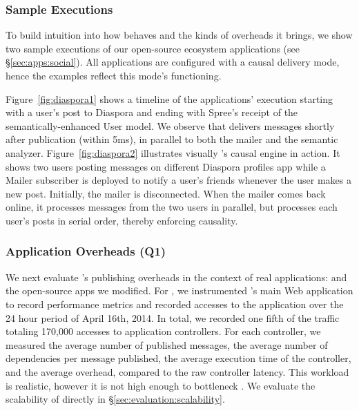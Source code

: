 \subsubsection{Sample Executions}
\label{sec:evaluation:sample-runs}

To build intuition into how \synapse behaves and the kinds of overheads it
brings, we show two sample executions of our open-source ecosystem
applications (see \S\ref{sec:apps:social}). All applications are configured
with a causal delivery mode, hence the examples reflect this mode's functioning.

Figure~\ref{fig:diaspora1} shows a timeline of the applications' execution
starting with a user's post to Diaspora and ending with Spree's receipt of the
semantically-enhanced User model. We observe that \synapse delivers messages
shortly after publication (within 5ms), in parallel to both the mailer and
the semantic analyzer.  Figure~\ref{fig:diaspora2}  illustrates visually
\synapse's causal engine in action. It shows two users posting messages on
different Diaspora profiles app while a Mailer subscriber is deployed to notify
a user's friends whenever the user makes a new post.  Initially, the mailer is
disconnected. When the mailer comes back online, it processes messages from the
two users in parallel, but processes each user's posts in serial order, thereby
enforcing causality.

\setlength{\tabcolsep}{4pt}

\subsubsection{Application Overheads (Q1)}
\label{sec:evaluation:overhead}

We next evaluate \synapse's publishing overheads in the context of real
applications: \crowdtap and the open-source apps we modified. For \crowdtap, we
instrumented \crowdtap's main Web application to record performance metrics and
recorded accesses to the application over the 24 hour period of April 16th,
2014. In total, we recorded one fifth of the traffic totaling 170,000 accesses
to application controllers. For each controller, we measured the average
number of published messages, the average number of dependencies per message
published, the average execution time of the controller, and the average
\synapse overhead, compared to the raw controller latency. This workload is
realistic, however it is not high enough to bottleneck \synapse. We evaluate
the scalability of \synapse directly in \S\ref{sec:evaluation:scalability}.

